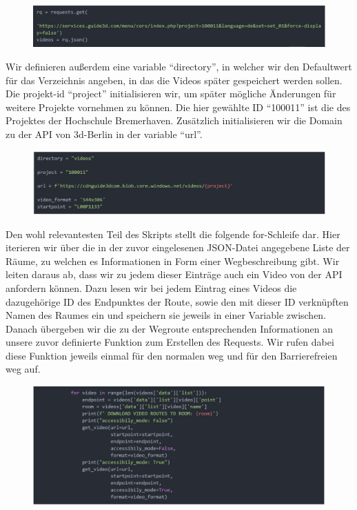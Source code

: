 \begin{figure}[H]
    \includegraphics[width=\textwidth]{Figures/3DNavigator/code01.jpg}
    \centering
\end{figure}\vspace{-2.5mm}

Wir definieren außerdem eine variable “directory”, in welcher wir den Defaultwert für das Verzeichnis angeben, in das die Videos später gespeichert werden sollen. Die projekt-id “project” initialisieren wir, um später mögliche Änderungen für weitere Projekte vornehmen zu können. Die hier gewählte ID “100011” ist die des Projektes der Hochschule Bremerhaven. Zusätzlich initialisieren wir die Domain zu der API von 3d-Berlin in der variable “url”.

\begin{figure}[H]
    \includegraphics[width=\textwidth]{Figures/3DNavigator/code02.jpg}
    \centering
\end{figure}\vspace{-2.5mm}

Den wohl relevantesten Teil des Skripts stellt die folgende for-Schleife dar. Hier iterieren wir über die in der zuvor eingelesenen JSON-Datei angegebene Liste der Räume, zu welchen es Informationen in Form einer Wegbeschreibung gibt. Wir leiten daraus ab, dass wir zu jedem dieser Einträge auch ein Video von der API anfordern können. Dazu lesen wir bei jedem Eintrag eines Videos die dazugehörige ID des Endpunktes der Route, sowie den mit dieser ID verknüpften Namen des Raumes ein und speichern sie jeweils in einer Variable zwischen. Danach übergeben wir die zu der Wegroute entsprechenden Informationen an unsere zuvor definierte Funktion zum Erstellen des Requests. Wir rufen dabei diese Funktion jeweils einmal für den normalen weg und für den Barrierefreien weg auf.

\begin{figure}[H]
    \includegraphics[width=\textwidth]{Figures/3DNavigator/code03.jpg}
    \centering
\end{figure}\vspace{-2.5mm}

